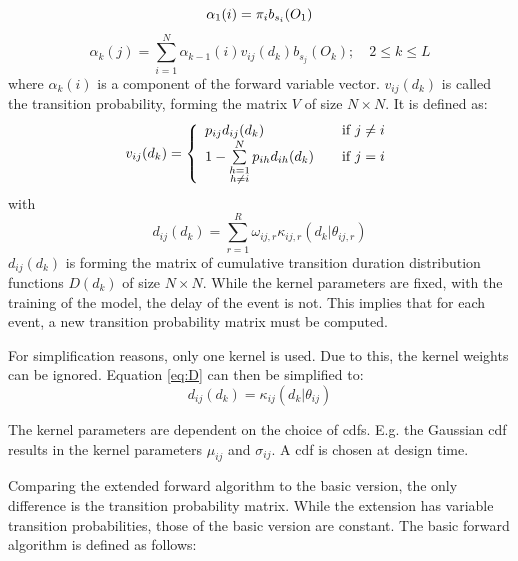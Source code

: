 \documentclass[mscthesis]{usiinfthesis}
\begin{document}
\begin{equation}
    \label{eq:forward_init}
    \alpha_1(i) = \pi_{i}b_{s_i}(O_1) \\
\end{equation}
\begin{equation}
    \label{eq:forward}
    \alpha_k(j) = \sum_{i=1}^{N} \alpha_{k-1}(i) v_{ij}(d_k) b_{s_j}(O_k);
    \quad 2 \leq k \leq L
\end{equation}
where $\alpha_k(i)$ is a component of the forward variable vector.
$v_{ij}(d_k)$ is called the transition probability, forming the matrix $V$ of
size $N \times N$. It is defined as:
\begin{equation}
    \label{eq:V}
    v_{ij}(d_k) = \left\{
        \begin{array}{l l}
            p_{ij} d_{ij}(d_k)
                & \quad \text{if $j \neq i$}\\
            1 - \sum\limits_{\substack{h=1 \\ h \neq i}}^{N} p_{ih} d_{ih}(d_k)
                & \quad \text{if $j = i$}
        \end{array} \right.
\end{equation}
with
\begin{equation}
    \label{eq:D}
    d_{ij}(d_k) = \sum_{r=1}^{R} \omega_{ij,r}\kappa_{ij,r}(d_k|\theta_{ij, r})
\end{equation}
$d_{ij}(d_k)$ is forming the matrix of cumulative transition duration
distribution functions $D(d_k)$ of size $ N\times N$. While the kernel
parameters are fixed, with the training of the model, the delay of the event
is not. This implies that for each event, a new transition probability matrix
must be computed.

For simplification reasons, only one kernel is used. Due to this, the kernel
weights can be ignored. Equation \ref{eq:D} can then be simplified to:
\begin{equation}
    \label{eq:D_fact}
    d_{ij}(d_k) = \kappa_{ij}(d_k | \theta_{ij})
\end{equation}

The kernel parameters are dependent on the choice of \glspl{cdf}. E.g. the
Gaussian \gls{cdf} results in the kernel parameters $\mu_{ij}$ and
$\sigma_{ij}$. A \gls{cdf} is chosen at design time.

Comparing the extended forward algorithm to the basic version, the only
difference is the transition probability matrix. While the extension has
variable transition probabilities, those of the basic version are constant. The
basic forward algorithm is defined as follows:
\end{document}
